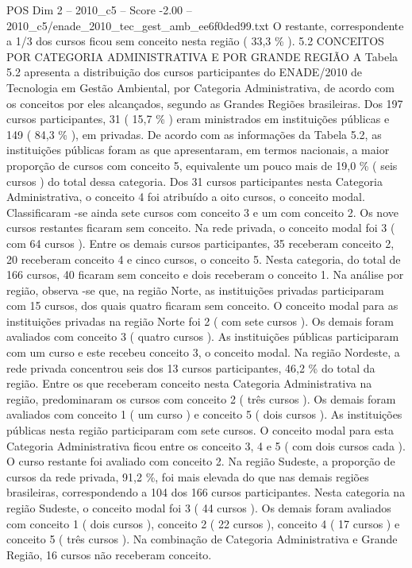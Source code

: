 \begin{textsample}{POS Dim 2 – 2010\_c5 – Score -2.00 – 2010\_c5/enade\_2010\_tec\_gest\_amb\_ee6f0ded99.txt}
O restante, correspondente a 1/3 dos cursos ficou sem conceito nesta região ( 33,3 \% ). 5.2 CONCEITOS POR CATEGORIA ADMINISTRATIVA E POR GRANDE REGIÃO A Tabela 5.2 apresenta a distribuição dos cursos participantes do ENADE/2010 de Tecnologia em Gestão Ambiental, por Categoria Administrativa, de acordo com os conceitos por eles alcançados, segundo as Grandes Regiões brasileiras.
Dos 197 cursos participantes, 31 ( 15,7 \% ) eram ministrados em instituições públicas e 149 ( 84,3 \% ), em privadas.
De acordo com as informações da Tabela 5.2, as instituições públicas foram as que apresentaram, em termos nacionais, a maior proporção de cursos com conceito 5, equivalente um pouco mais de 19,0 \% ( seis cursos ) do total dessa categoria.
Dos 31 cursos participantes nesta Categoria Administrativa, o conceito 4 foi atribuído a oito cursos, o conceito modal.
Classificaram -se ainda sete cursos com conceito 3 e um com conceito 2.
Os nove cursos restantes ficaram sem conceito.
Na rede privada, o conceito modal foi 3 ( com 64 cursos ).
Entre os demais cursos participantes, 35 receberam conceito 2, 20 receberam conceito 4 e cinco cursos, o conceito 5.
Nesta categoria, do total de 166 cursos, 40 ficaram sem conceito e dois receberam o conceito 1.
Na análise por região, observa -se que, na região Norte, as instituições privadas participaram com 15 cursos, dos quais quatro ficaram sem conceito.
O conceito modal para as instituições privadas na região Norte foi 2 ( com sete cursos ).
Os demais foram avaliados com conceito 3 ( quatro cursos ).
As instituições públicas participaram com um curso e este recebeu conceito 3, o conceito modal.
Na região Nordeste, a rede privada concentrou seis dos 13 cursos participantes, 46,2 \% do total da região.
Entre os que receberam conceito nesta Categoria Administrativa na região, predominaram os cursos com conceito 2 ( três cursos ).
Os demais foram avaliados com conceito 1 ( um curso ) e conceito 5 ( dois cursos ).
As instituições públicas nesta região participaram com sete cursos.
O conceito modal para esta Categoria Administrativa ficou entre os conceito 3, 4 e 5 ( com dois cursos cada ).
O curso restante foi avaliado com conceito 2.
Na região Sudeste, a proporção de cursos da rede privada, 91,2 \%, foi mais elevada do que nas demais regiões brasileiras, correspondendo a 104 dos 166 cursos participantes.
Nesta categoria na região Sudeste, o conceito modal foi 3 ( 44 cursos ).
Os demais foram avaliados com conceito 1 ( dois cursos ), conceito 2 ( 22 cursos ), conceito 4 ( 17 cursos ) e conceito 5 ( três cursos ).
Na combinação de Categoria Administrativa e Grande Região, 16 cursos não receberam conceito.

\end{textsample}
